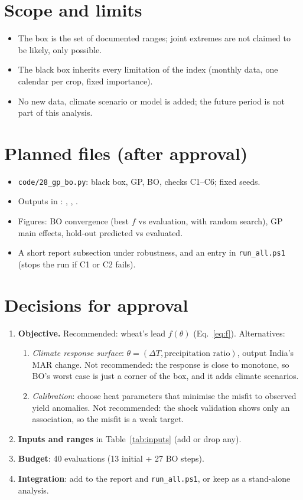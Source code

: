 \documentclass[11pt,a4paper]{article}
\numberwithin{equation}{section}
\begin{document}
\section{Scope and limits}
\begin{itemize}
\item The box is the set of documented ranges; joint extremes are not claimed to be likely, only possible.
\item The black box inherits every limitation of the index (monthly data, one calendar per crop, fixed importance).
\item No new data, climate scenario or model is added; the future period is not part of this analysis.
\end{itemize}

\section{Planned files (after approval)}
\begin{itemize}
\item \texttt{code/28\_gp\_bo.py}: black box, GP, BO, checks C1--C6; fixed seeds.
\item Outputs in : , ,
.
\item Figures: BO convergence (best $f$ vs evaluation, with random search), GP main effects, hold-out predicted vs
evaluated.
\item A short report subsection under robustness, and an entry in \texttt{run\_all.ps1} (stops the run if C1 or C2
fails).
\end{itemize}

\section{Decisions for approval}
\begin{enumerate}[leftmargin=*]
\item \textbf{Objective.} Recommended: wheat's lead $f(\theta)$ (Eq.~\ref{eq:f}). Alternatives:
  \begin{enumerate}[label=(\alph*)]
  \item \emph{Climate response surface}: $\theta=(\Delta T, \text{precipitation ratio})$, output India's MAR change.
  Not recommended: the response is close to monotone, so BO's worst case is just a corner of the box, and it adds
  climate scenarios.
  \item \emph{Calibration}: choose heat parameters that minimise the misfit to observed yield anomalies. Not
  recommended: the shock validation shows only an association, so the misfit is a weak target.
  \end{enumerate}
\item \textbf{Inputs and ranges} in Table~\ref{tab:inputs} (add or drop any).
\item \textbf{Budget}: 40 evaluations (13 initial + 27 BO steps).
\item \textbf{Integration}: add to the report and \texttt{run\_all.ps1}, or keep as a stand-alone analysis.
\end{enumerate}
\end{document}
